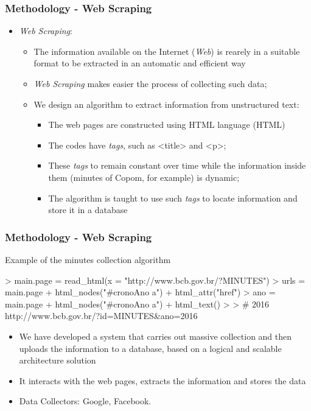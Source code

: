 \documentclass[aspectratio=169]{beamer}
\begin{document}
\begin{frame}\frametitle{Methodology - Web Scraping}
  \begin{itemize}
  \item \emph{Web Scraping}:
    \begin{itemize}
      \item The information available on the Internet (\emph{Web}) is rearely in a suitable format to be extracted in an automatic and efficient way
      \item \emph{Web Scraping} makes easier the process of collecting such data;
      \item We design an algorithm to extract information from unstructured text:
      \begin{itemize}
        \item The web pages are constructed using HTML language (HTML)
        \item The codes have \emph{tags}, such as <title> and <p>;
        \item These \emph{tags} to remain constant over time while the information inside them (minutes of Copom, for example) is dynamic;
        \item The algorithm is taught to use such \emph{tags} to locate information and store it in a database
      \end{itemize}
    \end{itemize}
  \end{itemize}
\end{frame}

\begin{frame}[fragile]\frametitle{Methodology - Web Scraping} 
  \begin{block}{Example of the minutes collection algorithm}
\begin{Schunk}
\begin{Sinput}
> main.page = read_html(x = "http://www.bcb.gov.br/?MINUTES")
> urls = main.page %
+   html_nodes("#cronoAno a") %
+   html_attr("href")  
> ano = main.page %
+   html_nodes("#cronoAno a") %
+   html_text() 
> 
> # 2016 http://www.bcb.gov.br/?id=MINUTES&ano=2016                                               
\end{Sinput}
\end{Schunk}
  \end{block}
  \begin{itemize}
    \item We have developed a system that carries out massive collection and then uploads the information to a database, based on a logical and scalable architecture solution
    \item It interacts with the web pages, extracts the information and stores the data
    \item Data Collectors: Google, Facebook.
  \end{itemize}
\end{frame}
\end{document}
